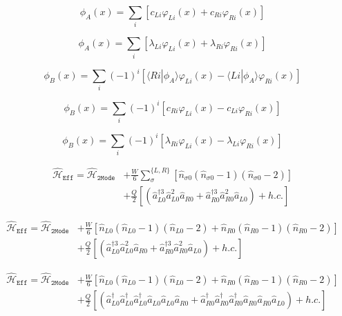 \documentclass[aps,floatfix,showpacs,pra]{revtex4}
\begin{document}
\begin{equation}
 \phi_A(x) = \sum\limits_i [c_{Li} \varphi_{Li}(x) + c_{Ri} \varphi_{Ri}(x)]
\end{equation}

\begin{equation}
 \phi_A(x) = \sum\limits_i [\lambda_{Li} \varphi_{Li}(x) + \lambda_{Ri} \varphi_{Ri}(x)]
\end{equation}


\begin{equation}
 \phi_B(x) = \sum\limits_i (-1)^i [ \langle Ri | \phi_A\rangle \varphi_{Li}(x) - \langle Li | \phi_A\rangle \varphi_{Ri}(x) ]
\end{equation}

\begin{equation}
 \phi_B(x) = \sum\limits_i (-1)^i [c_{Ri} \varphi_{Li}(x) - c_{Li} \varphi_{Ri}(x)]
\end{equation}

\begin{equation}
 \phi_B(x) = \sum\limits_i (-1)^i [\lambda_{Ri} \varphi_{Li}(x) - \lambda_{Li} \varphi_{Ri}(x)]
\end{equation}

\begin{equation}
\begin{split}
 \hat{\mathcal{H}}_\mathtt{Eff} = \hat{\mathcal{H}}_\mathtt{2Mode} &+ \frac{W}{6} \sum\limits_\sigma^{\{L,R\}} [\hat{n}_{\sigma 0}(\hat{n}_{\sigma 0} - 1)(\hat{n}_{\sigma 0} - 2)] \\
 &+ \frac{Q}{2} [(\hat{a}_{L0}^{\dagger 3} \hat{a}_{L0}^2 \hat{a}_{R0} + \hat{a}_{R0}^{\dagger 3} \hat{a}_{R0}^2 \hat{a}_{L0}) + h.c.]
 \end{split}
\end{equation}

\begin{equation}
\begin{split}
 \hat{\mathcal{H}}_\mathtt{Eff} = \hat{\mathcal{H}}_\mathtt{2Mode} &+ \frac{W}{6} [\hat{n}_{L0}(\hat{n}_{L0} - 1)(\hat{n}_{L0} - 2) + \hat{n}_{R0}(\hat{n}_{R0} - 1)(\hat{n}_{R0} - 2)] \\
 &+ \frac{Q}{2} [(\hat{a}_{L0}^{\dagger 3} \hat{a}_{L0}^2 \hat{a}_{R0} + \hat{a}_{R0}^{\dagger 3} \hat{a}_{R0}^2 \hat{a}_{L0}) + h.c.]
 \end{split}
\end{equation}

\begin{equation}
\begin{split}
 \hat{\mathcal{H}}_\mathtt{Eff} = \hat{\mathcal{H}}_\mathtt{2Mode} &+ \frac{W}{6} [\hat{n}_{L0}(\hat{n}_{L0} - 1)(\hat{n}_{L0} - 2) + \hat{n}_{R0}(\hat{n}_{R0} - 1)(\hat{n}_{R0} - 2)] \\
 &+ \frac{Q}{2} [(\hat{a}_{L0}^\dagger \hat{a}_{L0}^\dagger \hat{a}_{L0}^\dagger \hat{a}_{L0} \hat{a}_{L0} \hat{a}_{R0} + \hat{a}_{R0}^\dagger \hat{a}_{R0}^\dagger \hat{a}_{R0}^\dagger \hat{a}_{R0} \hat{a}_{R0} \hat{a}_{L0}) + h.c.]
 \end{split}
\end{equation}
\end{document}
